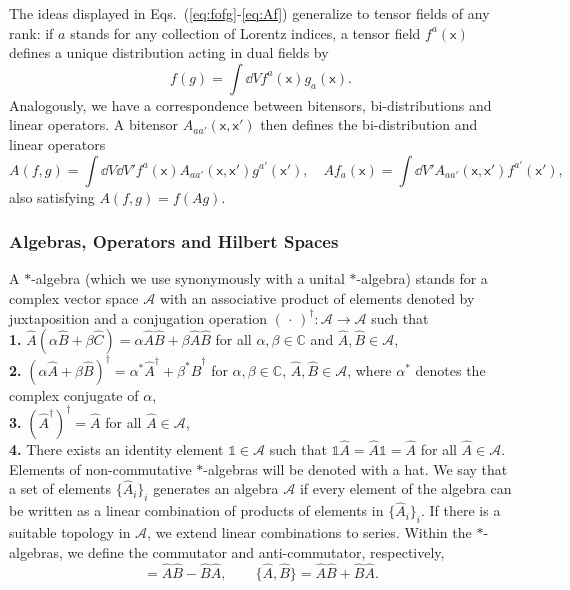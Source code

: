 \documentclass[letterpaper,12pt,titlepage,oneside,final]{book}
\newcommand{\openone}{\mathds{1}}
\newcommand{\mf}{\mathsf}%
\begin{document}
The ideas displayed in Eqs.~(\ref{eq:fofg}-\ref{eq:Af}) generalize to tensor fields of any rank: if $a$ stands for any collection of Lorentz indices, a tensor field $f^a(\mf x)$ defines a unique distribution acting in dual fields by
\begin{equation}
    f(g) = \int \dd V f^a(\mf x) g_a(\mf x).
\end{equation}
Analogously, we have a correspondence between bitensors, bi-distributions and linear operators. A bitensor $A_{aa'}(\mf x, \mf x')$ then defines the bi-distribution and linear operators
\begin{equation}
    A(f,g) = \int \dd V \dd V' f^a(\mf x) A_{aa'}(\mf x,\mf x') g^{a'}(\mf x'), \quad Af_a(\mf x) = \int \dd V' A_{aa'}(\mf x, \mf x')f^{a'}(\mf x'),
\end{equation}
also satisfying $A(f,g) = f(Ag)$. 


\subsubsection*{Algebras, Operators and Hilbert Spaces}

A $\ast$-algebra (which we use synonymously with a unital $\ast$-algebra) stands for a complex vector space $\mathcal{A}$ with an associative product of elements denoted by juxtaposition and a conjugation operation ${(\,\cdot\,)}^\dagger:\mathcal{A}\to\mathcal{A}$ such that\\[2mm]
\noindent \textbf{1.} $\hat{A}(\alpha \hat{B} + \beta \hat{C}) = \alpha \hat{A}\hat{B} + \beta \hat{A}\hat{B}$ for all $\alpha,\beta\in \mathbb{C}$ and $\hat{A},\hat{B}\in \mathcal{A}$,\\[2mm]
\noindent \textbf{2.} $(\alpha\hat{A} + \beta \hat{B})^\dagger = \alpha^*\hat{A}^\dagger + \beta^*\hat{B}^\dagger$ for $\alpha,\beta\in \mathbb{C}$, $\hat{A},\hat{B}\in \mathcal{A}$, where $\alpha^*$ denotes the complex conjugate of $\alpha$,\\[2mm]
\noindent \textbf{3.} $(\hat{A}^\dagger)^\dagger = \hat{A}$ for all $\hat{A}\in \mathcal{A}$,\\[2mm]
\noindent \textbf{4.} There exists an identity element $\openone\in \mathcal{A}$ such that $\openone \hat{A} = \hat{A} \openone = \hat{A}$ for all $\hat{A}\in \mathcal{A}$. \\[2mm]
\noindent Elements of non-commutative $\ast$-algebras will be denoted with a hat.  We say that a set of elements $\{\hat{A}_i\}_i$ generates an algebra $\mathcal{A}$ if every element of the algebra can be written as a linear combination of products of elements in $\{\hat{A}_i\}_i$. If there is a suitable topology in $\mathcal{A}$, we extend linear combinations to series. Within the $\ast$-algebras, we define the commutator and anti-commutator, respectively,
\begin{equation}
    [\hat{A},\hat{B}] = \hat{A} \hat{B} - \hat{B}\hat{A}, \quad \quad 
    \{\hat{A},\hat{B}\} = \hat{A} \hat{B} + \hat{B}\hat{A}.
\end{equation}
\end{document}
